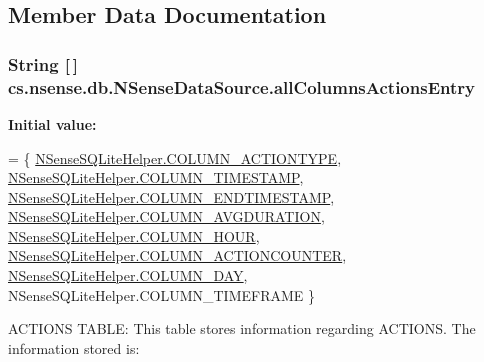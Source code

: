 \subsection{Member Data Documentation}
\hypertarget{classcs_1_1nsense_1_1db_1_1_n_sense_data_source_accdfc315a08687bea1f129ea1c2d1c33}{
\subsubsection[{all\-Columns\-Actions\-Entry}]{\setlength{\rightskip}{0pt plus 5cm}String \mbox{[}$\,$\mbox{]} cs.\-nsense.\-db.\-N\-Sense\-Data\-Source.\-all\-Columns\-Actions\-Entry\hspace{0.3cm}{\ttfamily [private]}}}\label{classcs_1_1nsense_1_1db_1_1_n_sense_data_source_accdfc315a08687bea1f129ea1c2d1c33}
{\bfseries Initial value\-:}
\begin{DoxyCode}
= \{ 
            \hyperlink{classcs_1_1nsense_1_1db_1_1_n_sense_s_q_lite_helper_a4c4a857f8054a2172b2a7f2857787c20}{NSenseSQLiteHelper.COLUMN\_ACTIONTYPE},
            \hyperlink{classcs_1_1nsense_1_1db_1_1_n_sense_s_q_lite_helper_a37a51662ad91359cdc1218f20e1de3b1}{NSenseSQLiteHelper.COLUMN\_TIMESTAMP},
            \hyperlink{classcs_1_1nsense_1_1db_1_1_n_sense_s_q_lite_helper_a68730f905d374511aa5caf74f9ee728e}{NSenseSQLiteHelper.COLUMN\_ENDTIMESTAMP},
            \hyperlink{classcs_1_1nsense_1_1db_1_1_n_sense_s_q_lite_helper_a00ad71140d9af9a9f820992793244221}{NSenseSQLiteHelper.COLUMN\_AVGDURATION},
            \hyperlink{classcs_1_1nsense_1_1db_1_1_n_sense_s_q_lite_helper_a9e10735627e7603a3fba1e9fa908efa6}{NSenseSQLiteHelper.COLUMN\_HOUR},
            \hyperlink{classcs_1_1nsense_1_1db_1_1_n_sense_s_q_lite_helper_a0a8906d703a22bdcad7fe68cff136c2c}{NSenseSQLiteHelper.COLUMN\_ACTIONCOUNTER},
            \hyperlink{classcs_1_1nsense_1_1db_1_1_n_sense_s_q_lite_helper_af9a46b1c32ed79596c97f182ab2fe4dd}{NSenseSQLiteHelper.COLUMN\_DAY},
            NSenseSQLiteHelper.COLUMN\_TIMEFRAME
    \}
\end{DoxyCode}
A\-C\-T\-I\-O\-N\-S T\-A\-B\-L\-E\-: This table stores information regarding A\-C\-T\-I\-O\-N\-S. The information stored is\-:
